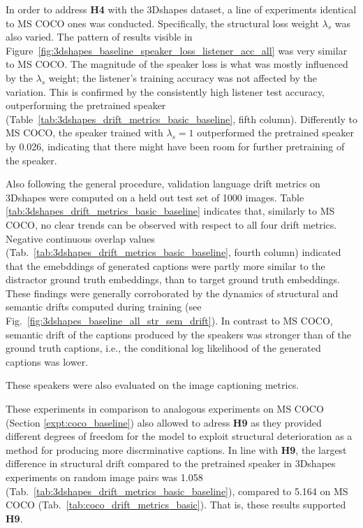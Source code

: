 In order to address \textbf{H4} with the 3Dshapes dataset, a line of experiments identical to MS COCO ones was conducted. Specifically, the structural loss weight $\lambda_s$ was also varied. The pattern of results visible in Figure~\ref{fig:3dshapes_baseline_speaker_loss_listener_acc_all} was very similar to MS COCO. The magnitude of the speaker loss is what was mostly influenced by the $\lambda_s$ weight; the listener's training accuracy was not affected by the variation. This is confirmed by the consistently high listener test accuracy, outperforming the pretrained speaker (Table~\ref{tab:3dshapes_drift_metrics_basic_baseline}, fifth column). Differently to MS COCO, the speaker trained with $\lambda_s = 1$ outperformed the pretrained speaker by 0.026, indicating that there might have been room for further pretraining of the speaker. 

Also following the general procedure, validation language drift metrics on 3Dshapes were computed on a held out test set of 1000 images. Table \ref{tab:3dshapes_drift_metrics_basic_baseline} indicates that, similarly to MS COCO, no clear trends can be observed with respect to all four drift metrics. Negative continuous overlap values (Tab.~\ref{tab:3dshapes_drift_metrics_basic_baseline}, fourth column) indicated that the emebddings of generated captions were partly more similar to the distractor ground truth embeddings, than to target ground truth embeddings. These findings were generally corroborated by the dynamics of structural and semantic drifts computed during training (see Fig.~\ref{fig:3dshapes_baseline_all_str_sem_drift}). In contrast to MS COCO, semantic drift of the captions produced by the speakers was stronger than of the ground truth captions, i.e., the conditional log likelihood of the generated captions was lower. 

These speakers were also evaluated on the image captioning metrics. 

These experiments in comparison to analogous experiments on MS COCO (Section \ref{expt:coco_baseline}) also allowed to adress \textbf{H9} as they provided different degrees of freedom for the model to exploit structural deterioration as a method for producing more discrminative captions. In line with \textbf{H9}, the largest difference in structural drift compared to the pretrained speaker in 3Dshapes experiments on random image pairs was 1.058 (Tab.~\ref{tab:3dshapes_drift_metrics_basic_baseline}), compared to 5.164 on MS COCO (Tab.~\ref{tab:coco_drift_metrics_basic}). That is, these results supported \textbf{H9}.

